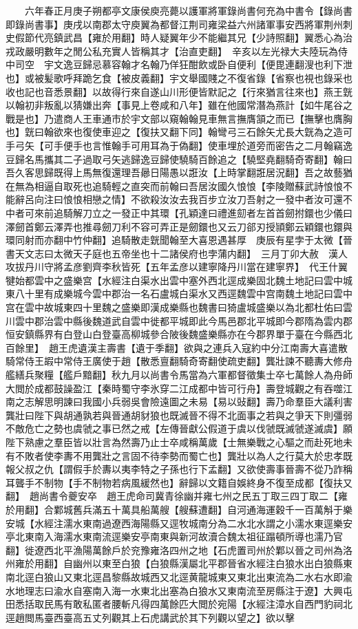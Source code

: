 　　六年春正月庚子朔都亭文康侯庾亮薨以護軍將軍錄尚書何充為中書令【錄尚書即錄尚書事】庚戌以南郡太守庾翼為都督江荆司雍梁益六州諸軍事安西將軍荆州刺史假節代亮鎮武昌【雍於用翻】時人疑翼年少不能繼其兄【少詩照翻】翼悉心為治戎政嚴明數年之閒公私充實人皆稱其才【治直吏翻】　辛亥以左光禄大夫陸玩為侍中司空　宇文逸豆歸忌慕容翰才名翰乃佯狂酣飲或卧自便利【便毘連翻溲也利下泄也】或被髪歌呼拜跪乞食【被皮義翻】宇文舉國賤之不復省錄【省察也視也錄采也收也記也音悉景翻】以故得行來自遂山川形便皆默記之【行來猶言往來也】燕王皝以翰初非叛亂以猜嫌出奔【事見上卷咸和八年】雖在他國常潛為燕計【如牛尾谷之戰是也】乃遣商人王車通市於宇文部以窺翰翰見車無言撫膺頷之而已【撫擊也膺胸也】皝曰翰欲來也復使車迎之【復扶又翻下同】翰彎弓三石餘矢尤長大皝為之造可手弓矢【可手便手也言惟翰手可用耳為于偽翻】使車埋於道旁而密告之二月翰竊逸豆歸名馬攜其二子過取弓矢逃歸逸豆歸使驍騎百餘追之【驍堅堯翻騎奇寄翻】翰曰吾久客思歸既得上馬無復還理吾曏日陽愚以誑汝【上時掌翻誑居況翻】吾之故藝猶在無為相逼自取死也追騎輕之直突而前翰曰吾居汝國久悢悢【李陵贈蘇武詩悢悢不能辭呂向注曰悢悢相戀之情】不欲殺汝汝去我百步立汝刀吾射之一發中者汝可還不中者可來前追騎解刀立之一發正中其環【孔穎達曰禮進劎者左首首劒拊鐶也少儀曰澤劒首鄭云澤弄也推尋劒刀利不容可弄正是劒鐶也又云刀郤刃授頴鄭云穎鐶也鐶與環同射而亦翻中竹仲翻】追騎散走皝聞翰至大喜恩遇甚厚　庚辰有星孛于太微【晉書天文志曰太微天子庭也五帝坐也十二諸侯府也孛蒲内翻】　三月丁卯大赦　漢人攻拔丹川守將孟彦劉齊李秋皆死【五年孟彦以建寧降丹川當在建寧界】　代王什翼犍始都雲中之盛樂宫【水經注白渠水出雲中塞外西北逕成樂固北魏土地記曰雲中城東八十里有成樂城今雲中郡治一名石盧城白渠水又西逕魏雲中宫南魏土地記曰雲中宫在雲中故城東四十里魏之盛樂即漢成樂縣也魏書曰猗盧城盛樂以為北都杜佑曰雲川雲中郡治雲中縣後魏道武自雲中徙都平城即此今馬邑郡北平城即今郡隋為雲内郡恒安鎮縣界有白登山白登臺高柳城參合陂後魏盛樂縣亦在今郡界單于臺在今縣西北百餘里】　趙王虎遺漢主壽書【遺于季翻】欲與之連兵入寇約中分江南壽大喜遣散騎常侍王嘏中常侍王廣使于趙【散悉亶翻騎奇寄翻使疏吏翻】龔壯諫不聽夀大修舟艦繕兵聚糧【艦戶黯翻】秋九月以尚書令馬當為六軍都督徵集士卒七萬餘人為舟師大閲於成都鼓譟盈江【秦時蜀守李氷穿二江成都中皆可行舟】壽登城觀之有吞噬江南之志解思明諫曰我國小兵弱吳會險遠圖之未易【易以䜴翻】壽乃命羣臣大議利害龔壯曰陛下與胡通孰若與晉通胡豺狼也既滅晉不得不北面事之若與之爭天下則彊弱不敵危亡之勢也虞虢之事已然之戒【左傳晉獻公假道于虞以伐虢既滅虢遂滅虞】願陛下熟慮之羣臣皆以壯言為然壽乃止士卒咸稱萬歲【士無樂戰之心驅之而赴死地未有不敗者使李夀不用龔壯之言固不待李勢而蜀亡也】龔壯以為人之行莫大於忠孝既報父叔之仇【謂假手於夀以夷李特之子孫也行下孟翻】又欲使壽事晉壽不從乃詐稱耳聾手不制物【手不制物若病風緩然也】辭歸以文籍自娛終身不復至成都【復扶又翻】　趙尚書令夔安卒　趙王虎命司冀青徐幽并雍七州之民五丁取三四丁取二【雍於用翻】合鄴城舊兵滿五十萬具船萬艘【艘蘇遭翻】自河通海運穀千一百萬斛于樂安城【水經注濡水東南過遼西海陽縣又逕牧城南分為二水北水謂之小濡水東逕樂安亭北東南入海濡水東南流逕樂安亭南東與新河故瀆合魏太祖征蹋頓所導也濡乃官翻】徙遼西北平漁陽萬餘戶於兖豫雍洛四州之地【石虎置司州於鄴以晉之司州為洛州雍於用翻】自幽州以東至白狼【白狼縣漢屬北平郡晉省水經注白狼水出白狼縣東南北逕白狼山又東北逕昌黎縣故城西又北逕黄龍城東又東北出東流為二水右水即渝水地理志曰渝水自塞南入海一水東北出塞為白狼水又東南流至房縣注于遼】大興屯田悉括取民馬有敢私匿者腰斬凡得四萬餘匹大閲於宛陽【水經注漳水自西門豹祠北逕趙閲馬臺西臺高五丈列觀其上石虎講武於其下列觀以望之】欲以擊